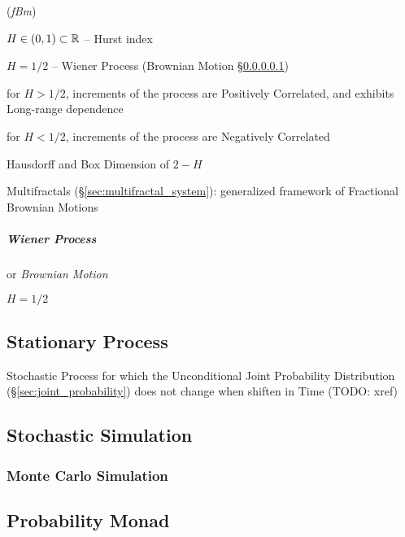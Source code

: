 (\emph{fBm})

$H \in (0,1) \subset \mathbb{R}$ -- Hurst index

$H = 1/2$ -- Wiener Process (Brownian Motion \S\ref{sec:wiener_process})

for $H > 1/2$, increments of the process are Positively Correlated, and exhibits
Long-range dependence

for $H < 1/2$, increments of the process are Negatively Correlated

Hausdorff and Box Dimension of $2 - H$

\fist Multifractals (\S\ref{sec:multifractal_system}): generalized framework of
Fractional Brownian Motions



\subparagraph{Wiener Process}\label{sec:wiener_process}\hfill

or \emph{Brownian Motion}

$H = 1/2$



\subsection{Stationary Process}\label{sec:stationary_process}

Stochastic Process for which the Unconditional Joint Probability Distribution
(\S\ref{sec:joint_probability}) does not change when shiften in Time (TODO:
xref)



\subsection{Stochastic Simulation}\label{sec:stochastic_simulation}

\subsubsection{Monte Carlo Simulation}\label{sec:monte_carlo}



\subsection{Probability Monad}\label{sec:probability_monad}

